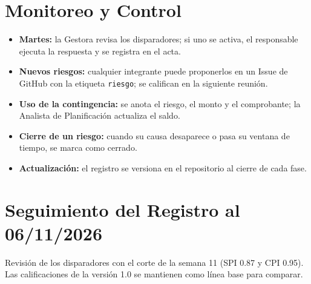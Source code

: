\documentclass[11pt,a4paper]{article}
\begin{document}
\section{Monitoreo y Control}
\begin{itemize}[leftmargin=*]
    \item \textbf{Martes:} la Gestora revisa los disparadores; si uno se activa, el responsable ejecuta la respuesta y se registra en el acta.
    \item \textbf{Nuevos riesgos:} cualquier integrante puede proponerlos en un Issue de GitHub con la etiqueta \texttt{riesgo}; se califican en la siguiente reunión.
    \item \textbf{Uso de la contingencia:} se anota el riesgo, el monto y el comprobante; la Analista de Planificación actualiza el saldo.
    \item \textbf{Cierre de un riesgo:} cuando su causa desaparece o pasa su ventana de tiempo, se marca como cerrado.
    \item \textbf{Actualización:} el registro se versiona en el repositorio al cierre de cada fase.
\end{itemize}

\section{Seguimiento del Registro al 06/11/2026}
Revisión de los disparadores con el corte de la semana 11 (SPI 0.87 y CPI 0.95). Las calificaciones de la versión 1.0 se mantienen como línea base para comparar.
\end{document}
